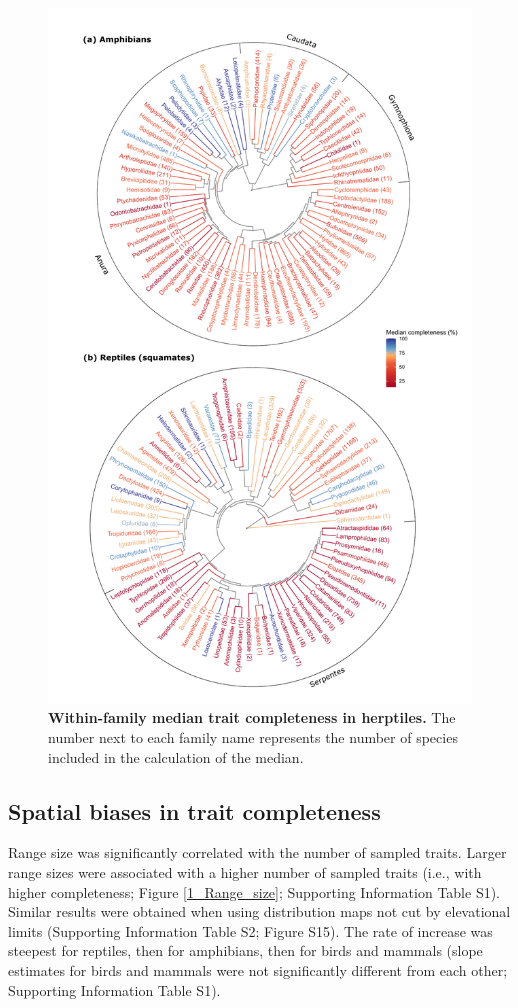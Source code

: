 \clearpage

\begin{figure}[h!]
\centering
\includegraphics[scale=0.5]{figures/Chapter1/Figure_3}
\caption[Within-family median trait completeness in herptiles.]{\textbf{Within-family median trait completeness in herptiles.} The number next to each family name represents the number of species included in the calculation of the median.}
\label{1_Phylo}
\end{figure}

\clearpage

\subsection{Spatial biases in trait completeness}
Range size was significantly correlated with the number of sampled traits. Larger range sizes were associated with a higher number of sampled traits (i.e., with higher completeness; Figure \ref{1_Range_size}; Supporting Information Table S1). Similar results were obtained when using distribution maps not cut by elevational limits (Supporting Information Table S2; Figure S15). The rate of increase was steepest for reptiles, then for amphibians, then for birds and mammals (slope estimates for birds and mammals were not significantly different from each other; Supporting Information Table S1).

